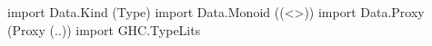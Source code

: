 \begin{code}
import Data.Kind   (Type)
import Data.Monoid ((<>))
import Data.Proxy  (Proxy (..))
import GHC.TypeLits
\end{code}
